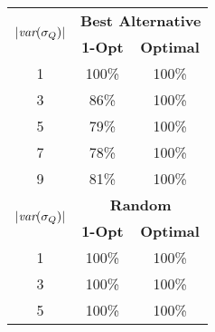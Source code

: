 \documentclass[twoside,11pt]{article}
\begin{document}
\begin{table}[t]
\centering \footnotesize
\begin{minipage}{0.30\textwidth} %
\centering
\begin{tabular}{|c|cc|}
\hline
\multirow{2}{*}{$|{\textit{var}(\sigma_Q)}|$} & \multicolumn{2}{c|}{\textbf{Best Alternative}}            \\ 
                                   & \multicolumn{1}{c|}{\textbf{1-Opt}}   & \textbf{Optimal}   \\ \hline 
1                                  & \multicolumn{1}{c|}{100\%}     & 100\%        \\ %
3                                  & \multicolumn{1}{c|}{86\%}      & 100\%        \\ %
5                                  & \multicolumn{1}{c|}{79\%}      & 100\%        \\ %
7                                  & \multicolumn{1}{c|}{78\%}      & 100\%        \\ %
9                                  & \multicolumn{1}{c|}{81\%}      & 100\%        \\ \hline \hline
\multirow{2}{*}{$|{\textit{var}(\sigma_Q)}|$} & \multicolumn{2}{c|}{\textbf{Random}}               \\ 
                                   & \multicolumn{1}{c|}{\textbf{1-Opt}}   & \textbf{Optimal}   \\ \hline 
1                                  & \multicolumn{1}{c|}{100\%}      & 100\%        \\ 
3                                  & \multicolumn{1}{c|}{100\%}      & 100\%        \\ 
5                                  & \multicolumn{1}{c|}{100\%}      & 100\%        \\ 

\end{tabular}
\end{minipage}
\end{table}
\end{document}

